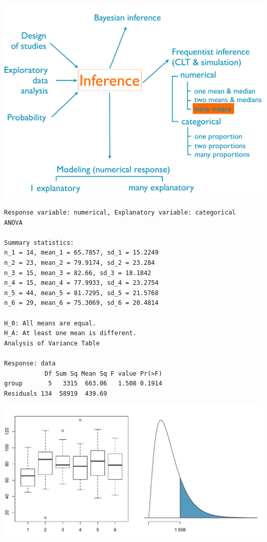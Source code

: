 \documentclass[slidestop,compress,mathserif,12pt,t,professionalfonts,xcolor=table]{beamer}
\begin{document}
\begin{frame}[fragile]

{
{\scriptsize
{}}}
{
 \includegraphics[width=\textwidth]{figures/map/many_mean}
}


{\scriptsize
\begin{verbatim}
Response variable: numerical, Explanatory variable: categorical
ANOVA

Summary statistics:
n_1 = 14, mean_1 = 65.7857, sd_1 = 15.2249
n_2 = 23, mean_2 = 79.9174, sd_2 = 23.284
n_3 = 15, mean_3 = 82.66, sd_3 = 18.1842
n_4 = 15, mean_4 = 77.9933, sd_4 = 23.2754
n_5 = 44, mean_5 = 81.7295, sd_5 = 21.5768
n_6 = 29, mean_6 = 75.3069, sd_6 = 20.4814

H_0: All means are equal.
H_A: At least one mean is different.
Analysis of Variance Table

Response: data
           Df Sum Sq Mean Sq F value Pr(>F)
group       5   3315  663.06   1.508 0.1914
Residuals 134  58919  439.69 
\end{verbatim}
}

\end{frame}


\begin{frame}

\includegraphics[width=\textwidth]{figures/anova/tellers}

\end{frame}
\end{document}
